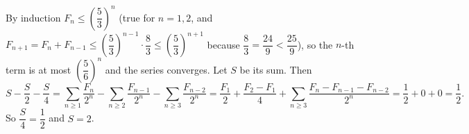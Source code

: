By induction $F_n\le\left(\dfrac{5}{3}\right)^n$ (true for $n=1,2$, and $F_{n+1}=F_n+F_{n-1}\le\left(\dfrac{5}{3}\right)^{n-1}\cdot\dfrac{8}{3}\le\left(\dfrac{5}{3}\right)^{n+1}$ because $\dfrac{8}{3}=\dfrac{24}{9}<\dfrac{25}{9}$), so the $n$-th term is at most $\left(\dfrac{5}{6}\right)^n$ and the series converges. Let $S$ be its sum. Then
\[
S-\dfrac {S}{2}-\dfrac {S}{4}=\sum_{n\ge1}\dfrac{F_n}{2^n}-\sum_{n\ge2}\dfrac{F_{n-1}}{2^n}-\sum_{n\ge3}\dfrac{F_{n-2}}{2^n}=\dfrac{F_1}{2}+\dfrac{F_2-F_1}{4}+\sum_{n\ge3}\dfrac{F_n-F_{n-1}-F_{n-2}}{2^n}=\dfrac{1}{2}+0+0=\dfrac{1}{2} .
\]
So $\dfrac {S}{4}=\dfrac{1}{2}$ and $S=\boxed{2}$.
